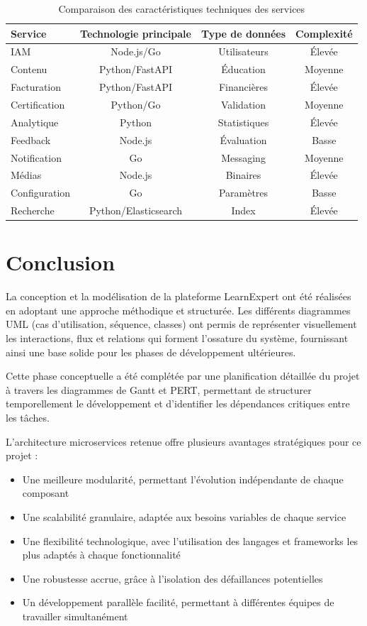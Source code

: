 \begin{table}[h!]
\centering
\small
\caption{Comparaison des caractéristiques techniques des services}
\label{tab:comparaison_services}
\begin{tabular}{|l|c|c|c|}
\hline
\textbf{Service} & \textbf{Technologie principale} & \textbf{Type de données} & \textbf{Complexité} \\
\hline
IAM & Node.js/Go & Utilisateurs & Élevée \\
Contenu & Python/FastAPI & Éducation & Moyenne \\
Facturation & Python/FastAPI & Financières & Élevée \\
Certification & Python/Go & Validation & Moyenne \\
Analytique & Python & Statistiques & Élevée \\
Feedback & Node.js & Évaluation & Basse \\
Notification & Go & Messaging & Moyenne \\
Médias & Node.js & Binaires & Élevée \\
Configuration & Go & Paramètres & Basse \\
Recherche & Python/Elasticsearch & Index & Élevée \\
\hline
\end{tabular}
\end{table}
\normalsize 

\section{Conclusion}

La conception et la modélisation de la plateforme LearnExpert ont été réalisées en adoptant une approche méthodique et structurée. Les différents diagrammes UML (cas d'utilisation, séquence, classes) ont permis de représenter visuellement les interactions, flux et relations qui forment l'ossature du système, fournissant ainsi une base solide pour les phases de développement ultérieures.

Cette phase conceptuelle a été complétée par une planification détaillée du projet à travers les diagrammes de Gantt et PERT, permettant de structurer temporellement le développement et d'identifier les dépendances critiques entre les tâches.

L'architecture microservices retenue offre plusieurs avantages stratégiques pour ce projet :
\begin{itemize}
  \item Une meilleure modularité, permettant l'évolution indépendante de chaque composant
  \item Une scalabilité granulaire, adaptée aux besoins variables de chaque service
  \item Une flexibilité technologique, avec l'utilisation des langages et frameworks les plus adaptés à chaque fonctionnalité
  \item Une robustesse accrue, grâce à l'isolation des défaillances potentielles
  \item Un développement parallèle facilité, permettant à différentes équipes de travailler simultanément
\end{itemize}

